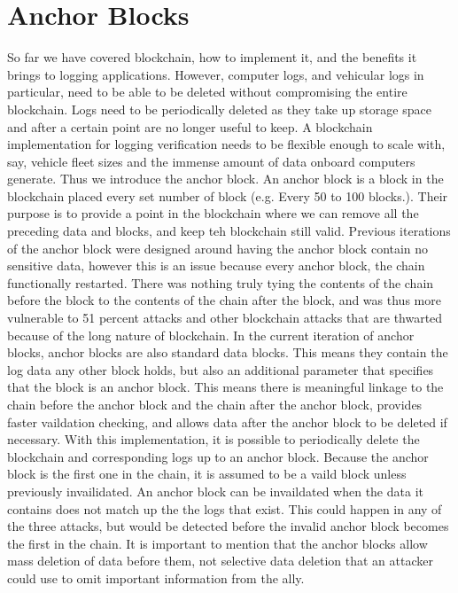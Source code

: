 \chapter{Anchor Blocks}

So far we have covered blockchain, how to implement it, and the benefits it brings to logging applications. However, computer logs, and vehicular logs in particular, need to be able to be deleted without compromising the entire blockchain. Logs need to be periodically deleted as they take up storage space and after a certain point are no longer useful to keep. A blockchain implementation for logging verification needs to be flexible enough to scale with, say, vehicle fleet sizes and the immense amount of data onboard computers generate. Thus we introduce the anchor block. An anchor block is a block in the blockchain placed every set number of block (e.g. Every 50 to 100 blocks.). Their purpose is to provide a point in the blockchain where we can remove all the preceding data and blocks, and keep teh blockchain still valid. 
Previous iterations of the anchor block were designed around having the anchor block contain no sensitive data, however this is an issue because every anchor block, the chain functionally restarted. There was nothing truly tying the contents of the chain before the block to the contents of the chain after the block, and was thus more vulnerable to 51 percent attacks and other blockchain attacks that are thwarted because of the long nature of blockchain.
In the current iteration of anchor blocks, anchor blocks are also standard data blocks. This means they contain the log data any other block holds, but also an additional parameter that specifies that the block is an anchor block. This means there is meaningful linkage to the chain before the anchor block and the chain after the anchor block, provides faster vaildation checking, and allows data after the anchor block to be deleted if necessary.
With this implementation, it is possible to periodically delete the blockchain and corresponding logs up to an anchor block. Because the anchor block is the first one in the chain, it is assumed to be a vaild block unless previously invailidated. An anchor block can be invaildated when the data it contains does not match up the the logs that exist. This could happen in any of the three attacks, but would be detected before the invalid anchor block becomes the first in the chain. It is important to mention that the anchor blocks allow mass deletion of data before them, not selective data deletion that an attacker could use to omit important information from the ally. 

